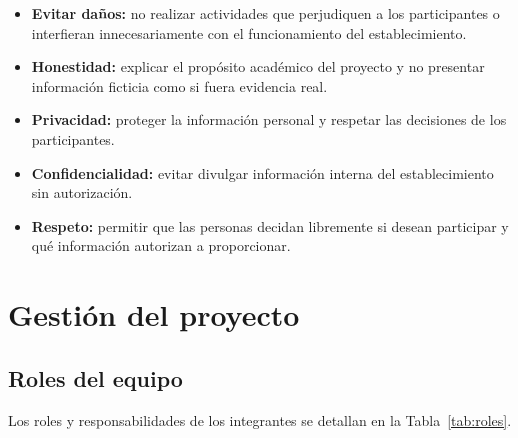 \documentclass[11pt,a4paper]{article}
\begin{document}
	\begin{itemize}
		\item \textbf{Evitar daños:} no realizar actividades que perjudiquen a los participantes o interfieran innecesariamente con el funcionamiento del establecimiento.
		\item \textbf{Honestidad:} explicar el propósito académico del proyecto y no presentar información ficticia como si fuera evidencia real.
		\item \textbf{Privacidad:} proteger la información personal y respetar las decisiones de los participantes.
		\item \textbf{Confidencialidad:} evitar divulgar información interna del establecimiento sin autorización.
		\item \textbf{Respeto:} permitir que las personas decidan libremente si desean participar y qué información autorizan a proporcionar.
	\end{itemize}
	
	
	\section{Gestión del proyecto}
	
	\subsection{Roles del equipo}
	
	Los roles y responsabilidades de los integrantes se detallan en la Tabla~\ref{tab:roles}.
	
\end{document}
